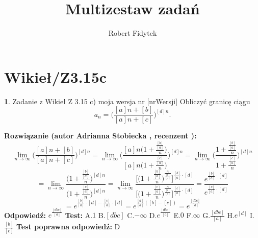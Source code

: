 \documentclass[12pt, a4paper]{article}
\title{Multizestaw zadań}
\author{Robert Fidytek}
\date{}
\theoremstyle{definition} %
\newtheorem{zad}{}
\newcommand{\kategoria}[1]{\section{#1}} %
\newcommand{\zadStart}[1]{\begin{zad}#1\newline} %
\newcommand{\zadStop}{\end{zad}}   %
\newcommand{\rozwStart}[2]{\noindent \textbf{Rozwiązanie (autor #1 , recenzent #2): }\newline} %
\newcommand{\rozwStop}{\newline}                                            %
\newcommand{\odpStart}{\noindent \textbf{Odpowiedź:}\newline}    %
\newcommand{\odpStop}{\newline}                                             %
\newcommand{\testStart}{\noindent \textbf{Test:}\newline} %
\newcommand{\testStop}{\newline} %
\newcommand{\kluczStart}{\noindent \textbf{Test poprawna odpowiedź:}\newline} %
\newcommand{\kluczStop}{\newline} %
\begin{document}
\maketitle


\kategoria{Wikieł/Z3.15c}
\zadStart{Zadanie z Wikieł Z 3.15 c) moja wersja nr [nrWersji]}
Obliczyć granicę ciągu 
$$a_n=\bigg(\frac{[a]n+[b]}{[a]n+[c]}\bigg)^{[d]n}.$$
\zadStop
\rozwStart{Adrianna Stobiecka}{}
$$\lim_{n\to\infty}\bigg(\frac{[a]n+[b]}{[a]n+[c]}\bigg)^{[d]n}=\lim_{n\to\infty}\Bigg(\frac{[a]n\big(1+\frac{\frac{[b]}{[a]}}{n}\big)}{[a]n\big(1+\frac{\frac{[c]}{[a]}}{n}\big)}\Bigg)^{[d]n}=\lim_{n\to\infty}\Bigg(\frac{1+\frac{\frac{[b]}{[a]}}{n}}{1+\frac{\frac{[c]}{[a]}}{n}}\Bigg)^{[d]n}$$
$$=\lim_{n\to\infty}\frac{\big(1+\frac{\frac{[b]}{[a]}}{n}\big)^{[d]n}}{\big(1+\frac{\frac{[c]}{[a]}}{n}\big)^{[d]n}}=\lim_{n\to\infty}\frac{\big[\big(1+\frac{\frac{[b]}{[a]}}{n}\big)^{\frac{n}{\frac{[b]}{[a]}}}\big]^{\frac{[b]}{[a]}\cdot[d]}}{\big[\big(1+\frac{\frac{[c]}{[a]}}{n}\big)^{\frac{n}{\frac{[c]}{[a]}}}\big]^{\frac{[c]}{[a]}\cdot[d]}}=\frac{e^{\frac{[b]}{[a]}\cdot[d]}}{e^{\frac{[c]}{[a]}\cdot[d]}}$$
$$=e^{\frac{[b]}{[a]}\cdot[d]-\frac{[c]}{[a]}\cdot[d]}=e^{\frac{[d]}{[a]}([b]-[c])}=e^{\frac{[dbc]}{[a]}}$$
\rozwStop
\odpStart
$e^{\frac{[dbc]}{[a]}}$
\odpStop
\testStart
A.$1$
B.$[dbc]$
C.$-\infty$
D.$e^{\frac{[dbc]}{[a]}}$
E.$0$
F.$\infty$
G.$\frac{[dbc]}{[a]}$
H.$e^{[d]}$
I.$\frac{[b]}{[c]}$
\testStop
\kluczStart
D
\kluczStop
\end{document}
